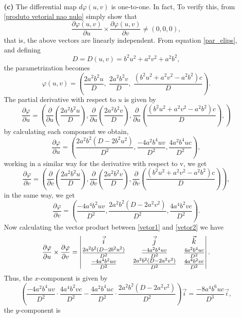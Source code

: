 \documentclass{amsart}
\theoremstyle{plain}
\numberwithin{equation}{section}
\begin{document}
\noindent\textbf{(c)} The differential map $d\varphi(u,v)$ is one-to-one. In fact, To verify this, from \eqref{produto vetorial nao nulo} simply show that
$$
\frac{\partial\varphi(u,v)}{\partial u} \times \frac{\partial\varphi(u,v)}{\partial v} \neq (0,0,0),
$$
that is, the above vectors are linearly independent. From equation \eqref{par_elips}, and defining
$$
D = D(u,v) = b^2u^2 + a^2v^2 + a^2b^2,
$$
the parametrization becomes
$$
\varphi(u,v) = \left( \frac{2a^2b^2u}{D}, \; \frac{2a^2b^2v}{D}, \; \frac{(b^2u^2 + a^2v^2 - a^2b^2)c}{D} \right).
$$
The partial derivative with respect to $u$ is given by
$$
\frac{\partial \varphi}{\partial u}  = \left( 
\frac{\partial}{\partial u}\left(\frac{2a^2b^2u}{D}\right), 
\frac{\partial}{\partial u}\left(\frac{2a^2b^2v}{D}\right), 
\frac{\partial}{\partial u}\left(\frac{(b^2u^2 + a^2v^2 - a^2b^2)c}{D}\right), 
\right) 
$$
by calculating each component we obtain,
\begin{equation}\label{vetor1}
	\frac{\partial \varphi}{\partial u} = \left( 
	\frac{2a^2b^2(D - 2b^2u^2)}{D^2}, 
	\frac{-4a^2b^4uv}{D^2}, 
	\frac{4a^2b^4uc}{D^2} 
	\right),
\end{equation}
working in a similar way for the derivative with respect to v, we get
$$
\frac{\partial \varphi}{\partial v} = \left( 
\frac{\partial}{\partial v}\left(\frac{2a^2b^2u}{D}\right), 
\frac{\partial}{\partial v}\left(\frac{2a^2b^2v}{D}\right), 
\frac{\partial}{\partial v}\left(\frac{(b^2u^2 + a^2v^2 - a^2b^2)c}{D}\right) 
\right),
$$
in the same way, we get
\begin{equation}\label{vetor2}
	\frac{\partial \varphi}{\partial v} = \left( 
	\frac{-4a^4b^2uv}{D^2}, 
	\frac{2a^2b^2(D - 2a^2v^2)}{D^2}, 
	\frac{4a^4b^2vc}{D^2} 
	\right).
\end{equation}
Now calculating the vector product between \eqref{vetor1} and \eqref{vetor2} we have
$$
\frac{\partial \varphi}{\partial u} \times \frac{\partial \varphi}{\partial v} = \large \begin{vmatrix} 
	\vec{i} & \vec{j} & \vec{k} \\
	\frac{2a^2b^2(D - 2b^2u^2)}{D^2} & \frac{-4a^2b^4uv}{D^2} & \frac{4a^2b^4uc}{D^2} \\
	\frac{-4a^4b^2uv}{D^2} & \frac{2a^2b^2(D - 2a^2v^2)}{D^2} & \frac{4a^4b^2vc}{D^2}
\end{vmatrix}.
$$
Thus, the \( x \)-component is given by
$$
\left( \frac{-4a^2b^4uv}{D^2} \cdot \frac{4a^4b^2vc}{D^2} - \frac{4a^2b^4uc}{D^2} \cdot \frac{2a^2b^2(D - 2a^2v^2)}{D^2} \right)\vec{i} = \frac{-8a^4b^6uc}{D^3}\vec{i},
$$
the \( y \)-component is
\end{document}
